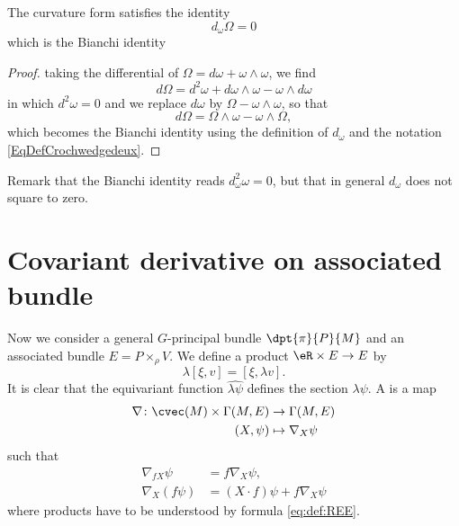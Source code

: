 \begin{proposition}
The curvature form satisfies the identity
\begin{equation}
d_{\omega}\Omega=0
\end{equation}
which is the Bianchi identity
\end{proposition}

\begin{proof}
taking the differential of $\Omega=d\omega+\omega\wedge\omega$, we find
\[ 
  d\Omega=d^2\omega+d\omega\wedge\omega-\omega\wedge d\omega
\]
in which $d^2\omega=0$ and we replace $d\omega$ by $\Omega-\omega\wedge\omega$, so that
\[ 
  d\Omega=\Omega\wedge\omega-\omega\wedge\Omega,
\]
which becomes the Bianchi identity using the definition of $d_{\omega}$ and the notation \eqref{EqDefCrochwedgedeux}.
\end{proof}
Remark that the Bianchi identity reads $d_{\omega}^2\omega=0$, but that in general $d_{\omega}$ does not square to zero. 

\section{Covariant derivative on associated bundle}

Now we consider a general $G$-principal bundle $\dpt{\pi}{P}{M}$ and an associated bundle $E=P\times_{\rho} V$. We define a product $\eR\times E\to E$ by
\begin{equation}\label{eq:def:REE}
  \lambda[\xi,v]=[\xi,\lambda v].
\end{equation}
It is clear that the equivariant function $\widehat{\lambda \psi}$ defines the section $\lambda\psi$. A  is a map 
		\begin{equation}
		\begin{aligned}
			\nabla \colon \cvec(M)\times \Gamma(M,E) &\to \Gamma(M,E)\\
			(X,\psi)&\mapsto \nabla_X\psi
		\end{aligned}
	\end{equation}	
such that 
\begin{subequations}
\begin{align}
\nabla_{fX}\psi&=f\nabla_X\psi,   \\
\nabla_X(f\psi)&=(X\cdot f)\psi+f\nabla_X\psi                                      \label{eq:def:der_covii}
\end{align}
\end{subequations}
where products have to be understood by formula \eqref{eq:def:REE}.

